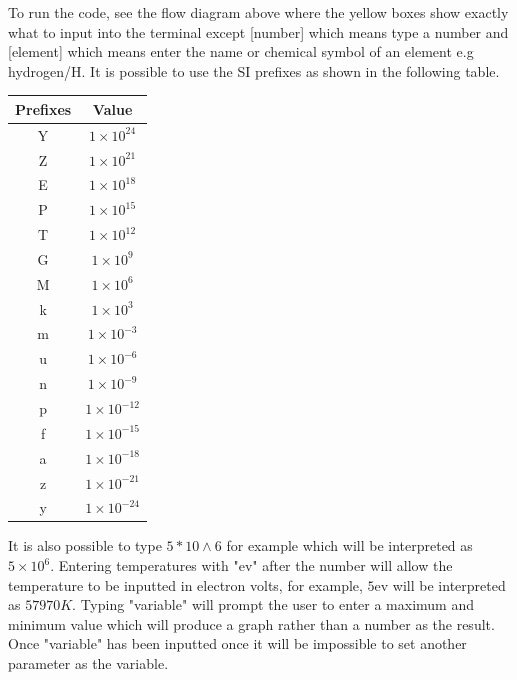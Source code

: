 \documentclass{journal}
\begin{document}
To run the code, see the flow diagram above where the yellow boxes show exactly what 
to input into the terminal except [number] which means type a number and [element] 
which means enter the name or chemical symbol of an element e.g hydrogen/H. 
It is possible to use the SI prefixes as shown in the following table. 

\smallskip

\begin{table}[H]
    \begin{adjustwidth}{4cm}{}
        \label{tab:ValueTable}
        \begin{tabular}{|c|c|} 
        \hline
        Prefixes & Value \\
        \hline
        Y  & $1 \times 10^{24}$ \\
        \hline
        Z & $1 \times 10^{21}$ \\
        \hline
        E & $1 \times 10^{18}$ \\
        \hline
        P & $1 \times 10^{15}$ \\
        \hline
        T & $1 \times 10^{12}$ \\
        \hline
        G & $1 \times 10^{9}$ \\
        \hline
        M & $1 \times 10^{6}$ \\
        \hline
        k & $1 \times 10^{3}$ \\
        \hline
        m & $1 \times 10^{-3}$ \\
        \hline
        u & $1 \times 10^{-6}$ \\
        \hline
        n & $1 \times 10^{-9}$ \\
        \hline
        p & $1 \times 10^{-12}$ \\
        \hline
        f & $1 \times 10^{-15}$ \\
        \hline
        a & $1 \times 10^{-18}$ \\
        \hline
        z & $1 \times 10^{-21}$ \\
        \hline
        y & $1 \times 10^{-24}$ \\
        \hline
        \end{tabular}
    \end{adjustwidth}
\end{table}

\smallskip

It is also possible to type $5 \ast 10 \wedge 6$ for example which will be interpreted as 
$5 \times 10^{6}$. Entering temperatures with "ev" after the number will allow the temperature to be 
inputted in electron volts, for example, $5$ev will be interpreted as $57970K$. 
Typing "variable" will prompt the user to enter a maximum and minimum value which will 
produce a graph rather than a number as the result. Once "variable" has been inputted once it 
will be impossible to set another parameter as the variable. 
\end{document}
